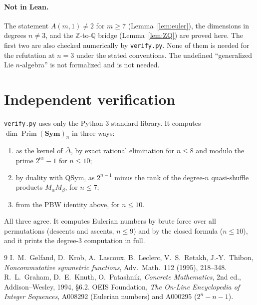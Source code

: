 \documentclass[11pt]{article}
\theoremstyle{remark}
\newcommand{\NSym}{\mathbf{Sym}}
\newcommand{\Prim}{\operatorname{Prim}}
\begin{document}
\paragraph{Not in Lean.} The statement $A(m,1)\ne2$ for $m\ge7$ (Lemma~\ref{lem:euler}),
the dimensions in degrees $n\ne3$, and the $\mathbb Z$-to-$\mathbb Q$ bridge (Lemma~\ref{lem:ZQ}) are
proved here. The first two are also checked numerically by \texttt{verify.py}. None of them is needed for the
refutation at $n=3$ under the stated conventions. The undefined
``generalized Lie $n$-algebra'' is not formalized and is not needed.

\section{Independent verification}\label{sec:verify}

\texttt{verify.py} uses only the Python 3 standard library. It computes
$\dim\Prim(\NSym)_n$ in three ways:
\begin{enumerate}
\item as the kernel of $\bar\Delta$, by exact rational elimination for $n\le8$ and modulo
the prime $2^{61}-1$ for $n\le10$;
\item by duality with QSym, as $2^{n-1}$ minus the rank of the degree-$n$ quasi-shuffle
products $M_\alpha M_\beta$, for $n\le7$;
\item from the PBW identity above, for $n\le10$.
\end{enumerate}
All three agree. It computes Eulerian numbers by brute force over all permutations
(descents and ascents, $n\le9$) and by the closed formula ($n\le10$), and it prints
the degree-$3$ computation in full.

\begin{thebibliography}{9}
 I.~M.~Gelfand, D.~Krob, A.~Lascoux, B.~Leclerc, V.~S.~Retakh, J.-Y.~Thibon,
\emph{Noncommutative symmetric functions}, Adv.\ Math.\ 112 (1995), 218--348.
 R.~L.~Graham, D.~E.~Knuth, O.~Patashnik, \emph{Concrete Mathematics}, 2nd ed.,
Addison--Wesley, 1994, \S6.2.
 OEIS Foundation, \emph{The On-Line Encyclopedia of Integer Sequences},
A008292 (Eulerian numbers) and A000295 ($2^n-n-1$).
\end{thebibliography}
\end{document}
